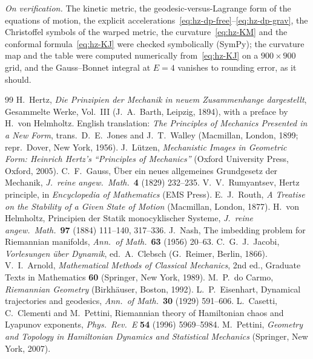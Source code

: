 \emph{On verification.} The kinetic metric, the geodesic-versus-Lagrange form of the equations of
motion, the explicit accelerations~\eqref{eq:hz-dp-free}--\eqref{eq:hz-dp-grav}, the Christoffel symbols
of the warped metric, the curvature~\eqref{eq:hz-KM} and the conformal
formula~\eqref{eq:hz-KJ} were checked symbolically (SymPy); the curvature map and the table were computed
numerically from~\eqref{eq:hz-KJ} on a $900\times900$ grid, and the Gauss--Bonnet integral at $E=4$
vanishes to rounding error, as it should.

\begingroup
\let\chapter\section
\renewcommand{\bibname}{References}
\begin{thebibliography}{99}
 H.~Hertz, \emph{Die Prinzipien der Mechanik in neuem Zusammenhange dargestellt},
  Gesammelte Werke, Vol.~III (J.~A.~Barth, Leipzig, 1894), with a preface by H.~von Helmholtz.
  English translation: \emph{The Principles of Mechanics Presented in a New Form}, trans.\ D.~E.~Jones and
  J.~T.~Walley (Macmillan, London, 1899; repr.\ Dover, New York, 1956).
 J.~L\"utzen, \emph{Mechanistic Images in Geometric Form: Heinrich Hertz's
  ``Principles of Mechanics''} (Oxford University Press, Oxford, 2005).
 C.~F.~Gauss, \"Uber ein neues allgemeines Grundgesetz der Mechanik,
  \emph{J.\ reine angew.\ Math.}\ \textbf{4} (1829) 232--235.
 V.~V.~Rumyantsev, Hertz principle, in \emph{Encyclopedia of Mathematics} (EMS Press).
 E.~J.~Routh, \emph{A Treatise on the Stability of a Given State of Motion}
  (Macmillan, London, 1877).
 H.~von Helmholtz, Principien der Statik monocyklischer Systeme,
  \emph{J.\ reine angew.\ Math.}\ \textbf{97} (1884) 111--140, 317--336.
 J.~Nash, The imbedding problem for Riemannian manifolds,
  \emph{Ann.\ of Math.}\ \textbf{63} (1956) 20--63.
 C.~G.~J.~Jacobi, \emph{Vorlesungen \"uber Dynamik}, ed.\ A.~Clebsch
  (G.~Reimer, Berlin, 1866).
 V.~I.~Arnold, \emph{Mathematical Methods of Classical Mechanics},
  2nd ed., Graduate Texts in Mathematics \textbf{60} (Springer, New York, 1989).
 M.~P.~do Carmo, \emph{Riemannian Geometry} (Birkh\"auser, Boston, 1992).
 L.~P.~Eisenhart, Dynamical trajectories and geodesics,
  \emph{Ann.\ of Math.}\ \textbf{30} (1929) 591--606.
 L.~Casetti, C.~Clementi and M.~Pettini, Riemannian theory of Hamiltonian
  chaos and Lyapunov exponents, \emph{Phys.\ Rev.\ E} \textbf{54} (1996) 5969--5984.
 M.~Pettini, \emph{Geometry and Topology in Hamiltonian Dynamics and
  Statistical Mechanics} (Springer, New York, 2007).
\end{thebibliography}
\endgroup
